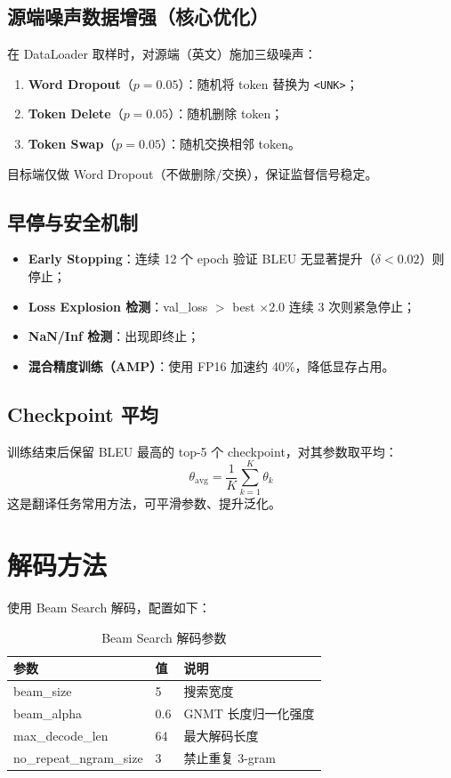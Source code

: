 \documentclass[12pt, a4paper]{ctexart}
\begin{document}
\subsection{源端噪声数据增强（核心优化）}

在 DataLoader 取样时，对源端（英文）施加三级噪声：
\begin{enumerate}[nosep]
  \item \textbf{Word Dropout}（$p=0.05$）：随机将 token 替换为 \texttt{<UNK>}；
  \item \textbf{Token Delete}（$p=0.05$）：随机删除 token；
  \item \textbf{Token Swap}（$p=0.05$）：随机交换相邻 token。
\end{enumerate}
目标端仅做 Word Dropout（不做删除/交换），保证监督信号稳定。

\subsection{早停与安全机制}

\begin{itemize}[nosep]
  \item \textbf{Early Stopping}：连续 12 个 epoch 验证 BLEU 无显著提升（$\delta < 0.02$）则停止；
  \item \textbf{Loss Explosion 检测}：val\_loss $>$ best $\times 2.0$ 连续 3 次则紧急停止；
  \item \textbf{NaN/Inf 检测}：出现即终止；
  \item \textbf{混合精度训练（AMP）}：使用 FP16 加速约 40\%，降低显存占用。
\end{itemize}

\subsection{Checkpoint 平均}

训练结束后保留 BLEU 最高的 top-5 个 checkpoint，对其参数取平均：
\begin{equation}
  \theta_{\text{avg}} = \frac{1}{K}\sum_{k=1}^{K} \theta_k
\end{equation}
这是翻译任务常用方法，可平滑参数、提升泛化。

\section{解码方法}

使用 Beam Search 解码，配置如下：

\begin{table}[H]
\centering
\caption{Beam Search 解码参数}
\begin{tabular}{lll}
\toprule
\textbf{参数} & \textbf{值} & \textbf{说明} \\
\midrule
beam\_size             & 5    & 搜索宽度 \\
beam\_alpha            & 0.6  & GNMT 长度归一化强度 \\
max\_decode\_len       & 64   & 最大解码长度 \\
no\_repeat\_ngram\_size & 3    & 禁止重复 3-gram \\
\bottomrule
\end{tabular}
\end{table}
\end{document}
